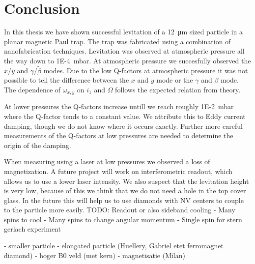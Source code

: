 \chapter{Conclusion}
\label{chap:conclusion}
In this thesis we have shown successful levitation of a \qty{12}{\micro\meter} sized  particle in a planar magnetic Paul trap. The trap was fabricated using a combination of nanofabrication techniques. Levitation was observed at atmospheric pressure all the way down to \qty{1E-4}{\milli\bar}. At atmospheric pressure we succesfully observed the $x$/$y$ and $\gamma$/$\tilde\beta$ modes. Due to the low Q-factors at atmospheric pressure it was not possible to tell the difference between the $x$ and $y$ mode or the $\gamma$ and $\beta$ mode. The dependence of $\omega_{x,y}$ on $i_1$ and $\Omega$ follows the expected relation from theory.

At lower pressures the Q-factors increase untill we reach roughly \qty{1E-2}{\milli\bar} where the Q-factor tends to a constant value. We attribute this to Eddy current damping, though we do not know where it occurs exactly. Further more careful measurements of the Q-factors at low pressures are needed to determine the origin of the damping.

When measuring using a laser at low pressures we observed a loss of magnetization. A future project will work on interferometric readout, which allows us to use a lower laser intensity. We also suspect that the levitation height is very low, because of this we think that we do not need a hole in the top cover glass. In the future this will help us to use diamonds with NV centers to couple to the particle more easily.
TODO: Readout or also sideband cooling
- Many spins to cool
- Many spins to change angular momentum
- Single spin for stern gerlach experiment

- smaller particle
- elongated particle (Huellery, Gabriel etet ferromagnet diamond)
- hoger B0 veld (met kern)
- magnetisatie (Milan)
